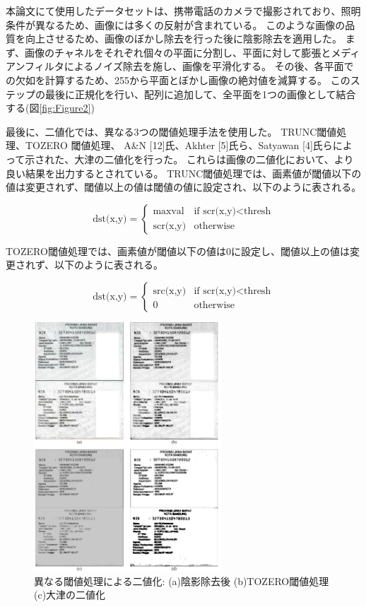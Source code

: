 \documentclass[uplatex, twocolumn,10pt]{jsarticle}
\begin{document}
本論文にて使用したデータセットは、携帯電話のカメラで撮影されており、照明条件が異なるため、画像には多くの反射が含まれている。
このような画像の品質を向上させるため、画像のぼかし除去を行った後に陰影除去を適用した。
まず、画像のチャネルをそれぞれ個々の平面に分割し、平面に対して膨張とメディアンフィルタによるノイズ除去を施し、画像を平滑化する。
その後、各平面での欠如を計算するため、255から平面とぼかし画像の絶対値を減算する。
このステップの最後に正規化を行い、配列に追加して、全平面を1つの画像として結合する(図\ref{fig:Figure2})

最後に、二値化では、異なる3つの閾値処理手法を使用した。
TRUNC閾値処理、TOZERO 閾値処理、 A\&N [12]氏、Akhter [5]氏ら、Satyawan [4]氏らによって示された、大津の二値化を行った。
これらは画像の二値化において、より良い結果を出力するとされている。
TRUNC閾値処理では、画素値が閾値以下の値は変更されず、閾値以上の値は閾値の値に設定され、以下のように表される。

\begin{equation}
    \text{dst(x,y)} =
    \left\{
    \begin{array}{ll}
        \text{maxval}   & \text{if scr(x,y)} < \text{thresh} \\
        \text{scr(x,y)} & \text{otherwise}
    \end{array}
    \right.
\end{equation}

TOZERO閾値処理では、画素値が閾値以下の値は0に設定し、閾値以上の値は変更されず、以下のように表される。

\begin{equation}
    \text{dst(x,y)} =
    \left\{
    \begin{array}{ll}
        \text{src(x,y)} & \text{if scr(x,y)} < \text{thresh} \\
        0               & \text{otherwise}
    \end{array}
    \right.
\end{equation}

\begin{figure}[t]
    \begin{center}
        \includegraphics*[width=7cm]{image/Figure3.png}
        \caption{異なる閾値処理による二値化: (a)陰影除去後 (b)TOZERO閾値処理 (c)大津の二値化}
        \label{fig:Figure3}
    \end{center}
\end{figure}
\end{document}
